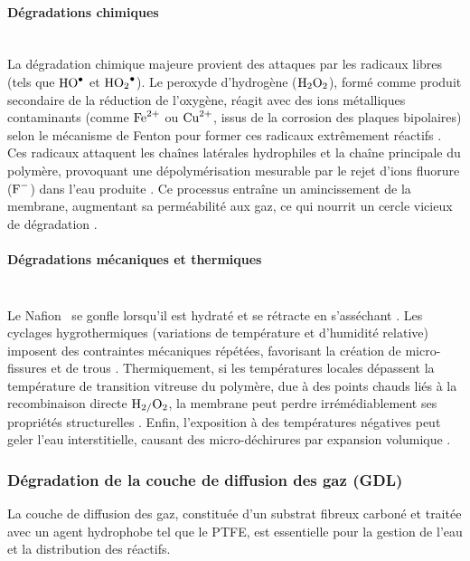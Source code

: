 \paragraph{Dégradations chimiques}\mbox{}\\
La dégradation chimique majeure provient des attaques par les radicaux libres (tels que $\ce{HO^{\bullet}}$ et $\ce{HO2^{\bullet}}$). Le peroxyde d'hydrogène ($\ce{H2O2}$), formé comme produit secondaire de la réduction de l'oxygène, réagit avec des ions métalliques contaminants (comme $\ce{Fe^{2+}}$ ou $\ce{Cu^{2+}}$, issus de la corrosion des plaques bipolaires) selon le mécanisme de Fenton pour former ces radicaux extrêmement réactifs \cite{wong_mitigation_2015}\cite{chandesris_membrane_2017}. Ces radicaux attaquent les chaînes latérales hydrophiles et la chaîne principale du polymère, provoquant une dépolymérisation mesurable par le rejet d'ions fluorure ($\ce{F^-}$) dans l'eau produite \cite{wong_macroscopic_2014}. Ce processus entraîne un amincissement de la membrane, augmentant sa perméabilité aux gaz, ce qui nourrit un cercle vicieux de dégradation \cite{wong_mitigation_2015}.

\paragraph{Dégradations mécaniques et thermiques}\mbox{}\\
Le Nafion\textsuperscript{\textregistered} \ se gonfle lorsqu'il est hydraté et se rétracte en s'asséchant \cite{lim_membrane_2014}. Les cyclages hygrothermiques (variations de température et d'humidité relative) imposent des contraintes mécaniques répétées, favorisant la création de micro-fissures et de trous \cite{banan_combined_2015}. Thermiquement, si les températures locales dépassent la température de transition vitreuse du polymère, due à des points chauds liés à la recombinaison directe $\ce{H2/O2}$, la membrane peut perdre irrémédiablement ses propriétés structurelles \cite{aubry_diagnostic_2022}. Enfin, l'exposition à des températures négatives peut geler l'eau interstitielle, causant des micro-déchirures par expansion volumique \cite{amamou_comprehensive_2016}.

\subsubsection{Dégradation de la couche de diffusion des gaz (GDL)}

La couche de diffusion des gaz, constituée d'un substrat fibreux carboné et traitée avec un agent hydrophobe tel que le PTFE, est essentielle pour la gestion de l'eau et la distribution des réactifs.

